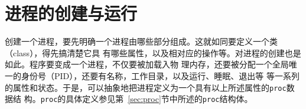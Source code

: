 \documentclass{swfuthesism}
\begin{document}


\section{进程的创建与运行}
\label{sec:proc-creation}

创建一个进程，要先明确一个进程由哪些部分组成。这就如同要定义一个类（class），得先搞清楚它具
有哪些属性，以及相对应的操作等。对进程的创建也是如此。程序要变成一个进程，不仅要被加载入物
理内存，还要被分配一个全局唯一的身份号（PID），还要有名称，工作目录，以及运行、睡眠、退出等
等一系列的属性和状态。于是，可以抽象地把进程定义为一个具有以上所述属性的\texttt{proc}数据结
构。\texttt{proc}的具体定义参见第~\ref{sec:proc}节中所述的\texttt{proc}结构体。
\end{document}
